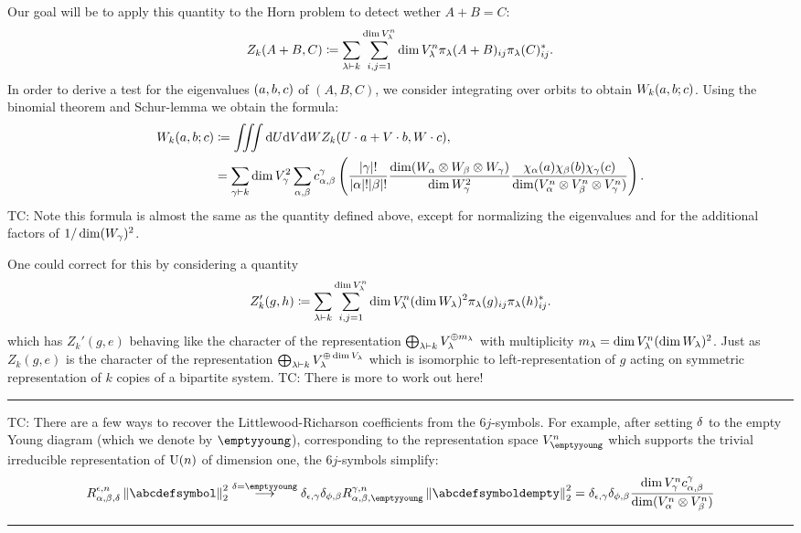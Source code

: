 \documentclass[notitlepage, 10pt]{article}
\begin{document}
    Our goal will be to apply this quantity to the Horn problem to detect wether $A+B = C$:
    \begin{equation}
        Z_k(A+B,C) \coloneqq \sum_{\lambda \vdash k} \sum_{i,j=1}^{\dim V_{\lambda}^{n}} \dim V_{\lambda}^{n} \pi_{\lambda}(A+B)_{ij} \pi_{\lambda}(C)_{ij}^{*}.
    \end{equation}
    In order to derive a test for the eigenvalues $(a,b,c)$ of $(A,B,C)$, we consider integrating over orbits to obtain $W_k(a,b;c)$.
    Using the binomial theorem and Schur-lemma we obtain the formula:
    \begin{align}
        W_k(a,b;c) 
        &\coloneqq \iiint \mathrm{d} U \mathrm{d} V \mathrm{d} W Z_k(U\cdot a+V\cdot b,W\cdot c), \\
        &= \sum_{\gamma \vdash k} \dim V_{\gamma}^2 \sum_{\alpha,\beta} c^{\gamma}_{\alpha,\beta} \left(\frac{{|\gamma|}!}{{|\alpha|}!{|\beta|}!}\frac{\dim (W_{\alpha} \otimes W_{\beta} \otimes W_{\gamma})}{\dim W_{\gamma}^2} \frac{\chi_{\alpha}(a)\chi_{\beta}(b)\chi_{\gamma}(c)}{\dim (V_{\alpha}^{n} \otimes V_{\beta}^{n} \otimes V_{\gamma}^{n})}\right).
    \end{align}
    TC: Note this formula is almost the same as the quantity defined above, except for normalizing the eigenvalues and for the additional factors of $1/\dim(W_{\gamma})^{2}$.

    One could correct for this by considering a quantity
    \begin{equation}
        Z_k'(g,h) \coloneqq \sum_{\lambda \vdash k} \sum_{i,j=1}^{\dim V_{\lambda}^{n}} \dim V_{\lambda}^{n}(\dim W_{\lambda})^2 \pi_{\lambda}(g)_{ij} \pi_{\lambda}(h)_{ij}^{*}.
    \end{equation}
    which has $Z_k'(g,e)$ behaving like the character of the representation $\bigoplus_{\lambda \vdash k} V_{\lambda}^{\oplus m_{\lambda}}$ with multiplicity $m_{\lambda} = \dim V_{\lambda}^{n}(\dim W_{\lambda})^2$.
    Just as $Z_k(g,e)$ is the character of the representation $\bigoplus_{\lambda \vdash k} V_{\lambda}^{\oplus \dim V_{\lambda}}$ which is isomorphic to left-representation of $g$ acting on symmetric representation of $k$ copies of a bipartite system. 
    TC: There is more to work out here!
\hrule
    TC: There are a few ways to recover the Littlewood-Richarson coefficients from the $6j$-symbols.
    For example, after setting $\delta$ to the empty Young diagram (which we denote by $\emptyyoung$), corresponding to the representation space $V_{\emptyyoung}^{n}$ which supports the trivial irreducible representation of $\operatorname{U}(n)$ of dimension one, the $6j$-symbols simplify:
    \begin{equation}
        R^{\ye,n}_{\ya,\yb,\yd}\norm{\abcdefsymbol}_2^2 
        \stackrel{\yd=\emptyyoung}{\longrightarrow} 
        \delta_{\ye,\yc}\delta_{\yf,\yb} R^{\yc,n}_{\ya,\yb,\emptyyoung}\norm{\abcdefsymboldempty}_2^2
        =\delta_{\ye,\yc}\delta_{\yf,\yb} \frac{\dim V_{\yc}^{n} c^{\yc}_{\ya,\yb}}{\dim (V_{\ya}^{n} \ot V_{\yb}^{n})}
    \end{equation}
\hrule
\end{document}

